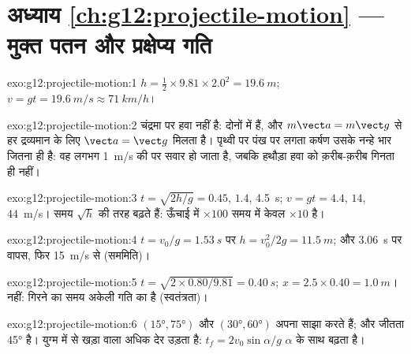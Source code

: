 \section*{अध्याय \ref{ch:g12:projectile-motion} --- मुक्त पतन और प्रक्षेप्य गति}

\begin{solution}{exo:g12:projectile-motion:1}
$h = \tfrac12 \times 9.81 \times 2.0^2 = \qty{19.6}{m}$; $v = gt = \qty{19.6}{m/s} \approx \qty{71}{km/h}$।
\end{solution}

\begin{solution}{exo:g12:projectile-motion:2}
चंद्रमा पर हवा नहीं है: दोनों  में हैं, और $m\vect a = m\vect g$ से हर
द्रव्यमान के लिए $\vect a = \vect g$ मिलता है। पृथ्वी पर पंख पर लगता कर्षण उसके नन्हे
भार जितना ही है: वह लगभग \qty{1}{m/s} की  पर सवार हो जाता
है, जबकि हथौड़ा हवा को क़रीब-क़रीब गिनता ही नहीं।
\end{solution}

\begin{solution}{exo:g12:projectile-motion:3}
$t = \sqrt{2h/g} = 0.45$, $1.4$, \qty{4.5}{s}; $v = gt = 4.4$, $14$, \qty{44}{m/s}। समय $\sqrt h$ की तरह बढ़ते हैं:
ऊँचाई में $\times 100$ समय में केवल $\times 10$ है।
\end{solution}

\begin{solution}{exo:g12:projectile-motion:4}
$t = v_0/g = \qty{1.53}{s}$ पर $h = v_0^2/2g = \qty{11.5}{m}$; और \qty{3.06}{s} पर वापस, फिर \qty{15}{m/s} से (सममिति)।
\end{solution}

\begin{solution}{exo:g12:projectile-motion:5}
$t = \sqrt{2 \times 0.80/9.81} = \qty{0.40}{s}$; $x = 2.5 \times 0.40 = \qty{1.0}{m}$। नहीं: गिरने का समय अकेली  गति का है (स्वतंत्रता)।
\end{solution}

\begin{solution}{exo:g12:projectile-motion:6}
$(\ang{15},\ang{75})$ और $(\ang{30},\ang{60})$ अपना  साझा करते हैं; और जीतता \ang{45} है। 
युग्म में से खड़ा वाला अधिक देर उड़ता है: $t_f = 2v_0\sin\alpha/g$ $\alpha$ के साथ बढ़ता है।
\end{solution}

